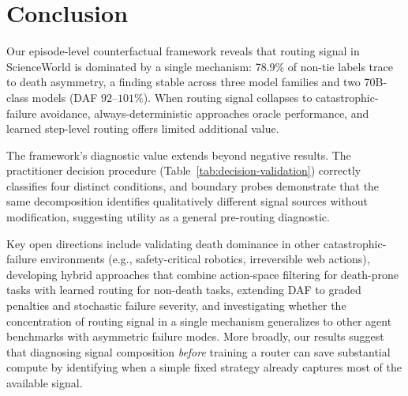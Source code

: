 \section{Conclusion}

Our episode-level counterfactual framework reveals that routing signal in ScienceWorld is dominated by a single mechanism: 78.9\% of non-tie labels trace to death asymmetry, a finding stable across three model families and two 70B-class models (DAF $92$--$101\%$). When routing signal collapses to catastrophic-failure avoidance, always-deterministic approaches oracle performance, and learned step-level routing offers limited additional value.

The framework's diagnostic value extends beyond negative results. The practitioner decision procedure (Table~\ref{tab:decision-validation}) correctly classifies four distinct conditions, and boundary probes demonstrate that the same decomposition identifies qualitatively different signal sources without modification, suggesting utility as a general pre-routing diagnostic.

Key open directions include validating death dominance in other catastrophic-failure environments (e.g., safety-critical robotics, irreversible web actions), developing hybrid approaches that combine action-space filtering for death-prone tasks with learned routing for non-death tasks, extending DAF to graded penalties and stochastic failure severity, and investigating whether the concentration of routing signal in a single mechanism generalizes to other agent benchmarks with asymmetric failure modes. More broadly, our results suggest that diagnosing signal composition \emph{before} training a router can save substantial compute by identifying when a simple fixed strategy already captures most of the available signal.
